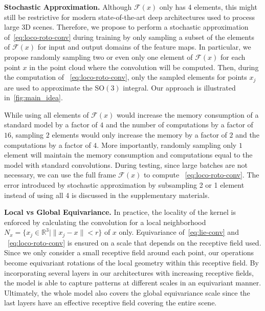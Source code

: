 \textbf{Stochastic Approximation.}
Although $\mathcal{F}(x)$ only has 4 elements, this might still be restrictive for modern state-of-the-art deep architectures used to process large 3D scenes.
Therefore, we propose to perform a stochastic approximation of~\cref{eq:loco-roto-conv} during training by only sampling a subset of the elements of $\mathcal{F}(x)$ for input and output domains of the feature maps.
In particular, we propose randomly sampling two or even only one element of $\mathcal{F}(x)$ for each point $x$ in the point cloud where the convolution will be computed.
Then, during the computation of ~\cref{eq:loco-roto-conv}, only the sampled elements for points $x_j$ are used to approximate the SO$(3)$ integral.
Our approach is illustrated in~\cref{fig:main_idea}.

While using all elements of $\mathcal{F}(x)$ would increase the memory consumption of a standard model by a factor of $4$ and the number of computations by a factor of $16$, sampling $2$ elements would only increase the memory by a factor of $2$ and the computations by a factor of $4$.
More importantly, randomly sampling only $1$ element will maintain the memory consumption and computations equal to the model with standard convolutions.
During testing, since large batches are not necessary, we can use the full frame $\mathcal{F}(x)$ to compute ~\cref{eq:loco-roto-conv}. The error introduced by stochastic approximation by subsampling 2 or 1 element instead of using all 4 is discussed in the supplementary materials.

\textbf{Local vs Global Equivariance.} 
In practice, the locality of the kernel is enforced by calculating the convolution for a local neighborhood $N_x=\{x_j \in \mathbb{R}^3|\|x_j - x\| <r\}$ of $x$ only. 
Equivariance of~\cref{eq:lie-conv} and ~\cref{eq:loco-roto-conv} is ensured on a scale that depends on the receptive field used. 
Since we only consider a small receptive field around each point, our operations become equivariant \wrt rotations of the local geometry within this receptive field. By incorporating several layers in our architectures with increasing receptive fields, the model is able to capture patterns at different scales in an equivariant manner.
Ultimately, the whole model also covers the global equivariance scale since the last layers have an effective receptive field covering the entire scene.








 




